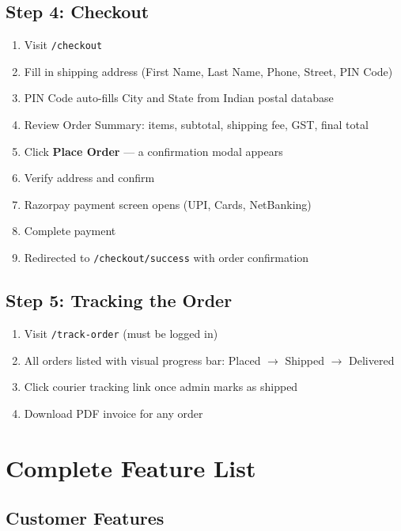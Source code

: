 \documentclass[12pt,a4paper]{article}
\begin{document}
\subsection{Step 4: Checkout}
\begin{enumerate}[leftmargin=2em, itemsep=3pt]
  \item Visit \texttt{/checkout}
  \item Fill in shipping address (First Name, Last Name, Phone, Street, PIN Code)
  \item PIN Code auto-fills City and State from Indian postal database
  \item Review Order Summary: items, subtotal, shipping fee, GST, final total
  \item Click \textbf{Place Order} — a confirmation modal appears
  \item Verify address and confirm
  \item Razorpay payment screen opens (UPI, Cards, NetBanking)
  \item Complete payment
  \item Redirected to \texttt{/checkout/success} with order confirmation
\end{enumerate}

\subsection{Step 5: Tracking the Order}
\begin{enumerate}[leftmargin=2em, itemsep=3pt]
  \item Visit \texttt{/track-order} (must be logged in)
  \item All orders listed with visual progress bar: Placed $\rightarrow$ Shipped $\rightarrow$ Delivered
  \item Click courier tracking link once admin marks as shipped
  \item Download PDF invoice for any order
\end{enumerate}

\section{Complete Feature List}

\subsection{Customer Features}
\end{document}

